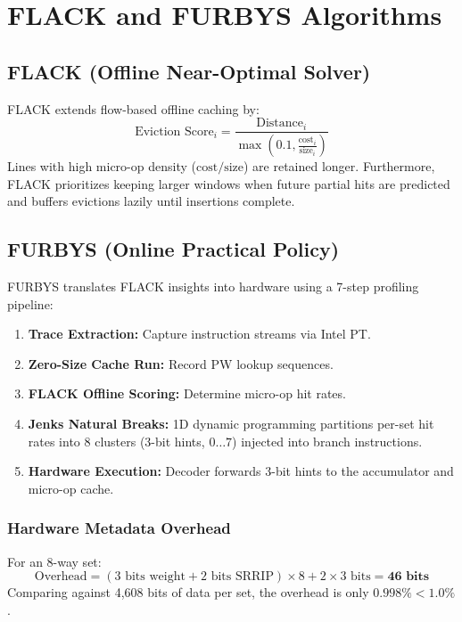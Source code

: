 \documentclass[10pt,twocolumn]{article}
\begin{document}
\section{FLACK and FURBYS Algorithms}

\subsection{FLACK (Offline Near-Optimal Solver)}
FLACK extends flow-based offline caching by:
\begin{equation}
\text{Eviction Score}_i = \frac{\text{Distance}_i}{\max\left(0.1, \frac{\text{cost}_i}{\text{size}_i}\right)}
\end{equation}
Lines with high micro-op density ($\text{cost}/\text{size}$) are retained longer. Furthermore, FLACK prioritizes keeping larger windows when future partial hits are predicted and buffers evictions lazily until insertions complete.

\subsection{FURBYS (Online Practical Policy)}
FURBYS translates FLACK insights into hardware using a 7-step profiling pipeline:
\begin{enumerate}
    \item \textbf{Trace Extraction:} Capture instruction streams via Intel PT.
    \item \textbf{Zero-Size Cache Run:} Record PW lookup sequences.
    \item \textbf{FLACK Offline Scoring:} Determine micro-op hit rates.
    \item \textbf{Jenks Natural Breaks:} 1D dynamic programming partitions per-set hit rates into 8 clusters (3-bit hints, $0\dots 7$) injected into branch instructions.
    \item \textbf{Hardware Execution:} Decoder forwards 3-bit hints to the accumulator and micro-op cache.
\end{enumerate}

\subsubsection{Hardware Metadata Overhead}
For an 8-way set:
\begin{equation}
\text{Overhead} = (3\text{ bits weight} + 2\text{ bits SRRIP}) \times 8 + 2 \times 3\text{ bits} = \mathbf{46\text{ bits}}
\end{equation}
Comparing against 4,608 bits of data per set, the overhead is only $\mathbf{0.998\%} < \mathbf{1.0\%}$.
\end{document}
